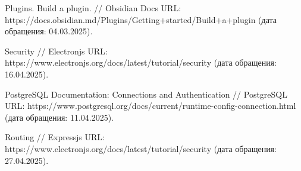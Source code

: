 \documentclass[14pt]{extarticle}
\begin{document}
\begin{thebibliography}{2}
		Plugins. Build a plugin. // Obsidian Docs URL: https://docs.obsidian.md/Plugins/Getting+started/Build+a+plugin (дата обращения: 04.03.2025).
		
		
		Security // Electronjs URL: \\https://www.electronjs.org/docs/latest/tutorial/security (дата обращения: 16.04.2025).
		
		 PostgreSQL Documentation: Connections and Authentication // PostgreSQL URL: https://www.postgresql.org/docs/current/runtime-config-connection.html (дата обращения: 11.04.2025).
		
		Routing // Expressjs URL:\\ https://www.electronjs.org/docs/latest/tutorial/security (дата обращения: 27.04.2025).
		
		
		
	\end{thebibliography}
	
	
	
	
\end{document}
